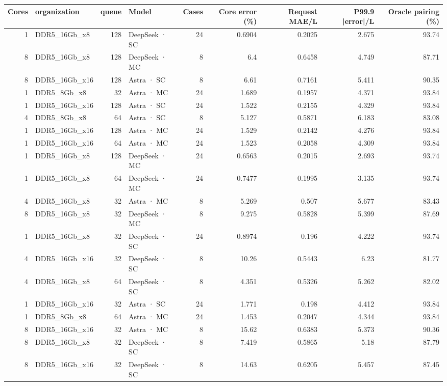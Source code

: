 \begin{tabular}{rlrlrrrrr}
\toprule
Cores & organization & queue & Model & Cases & Core error (\%) & Request MAE/L & P99.9 |error|/L & Oracle pairing (\%) \\
\midrule
1 & DDR5\_16Gb\_x8 & 128 & DeepSeek · SC & 24 & 0.6904 & 0.2025 & 2.675 & 93.74 \\
8 & DDR5\_16Gb\_x8 & 128 & DeepSeek · MC & 8 & 6.4 & 0.6458 & 4.749 & 87.71 \\
8 & DDR5\_16Gb\_x16 & 128 & Astra · SC & 8 & 6.61 & 0.7161 & 5.411 & 90.35 \\
1 & DDR5\_8Gb\_x8 & 32 & Astra · MC & 24 & 1.689 & 0.1957 & 4.371 & 93.84 \\
1 & DDR5\_16Gb\_x16 & 128 & Astra · SC & 24 & 1.522 & 0.2155 & 4.329 & 93.84 \\
4 & DDR5\_8Gb\_x8 & 64 & Astra · SC & 8 & 5.127 & 0.5871 & 6.183 & 83.08 \\
1 & DDR5\_16Gb\_x16 & 128 & Astra · MC & 24 & 1.529 & 0.2142 & 4.276 & 93.84 \\
1 & DDR5\_16Gb\_x16 & 64 & Astra · MC & 24 & 1.523 & 0.2058 & 4.309 & 93.84 \\
1 & DDR5\_16Gb\_x8 & 128 & DeepSeek · MC & 24 & 0.6563 & 0.2015 & 2.693 & 93.74 \\
1 & DDR5\_16Gb\_x8 & 64 & DeepSeek · MC & 24 & 0.7477 & 0.1995 & 3.135 & 93.74 \\
4 & DDR5\_16Gb\_x8 & 32 & Astra · MC & 8 & 5.269 & 0.507 & 5.677 & 83.43 \\
8 & DDR5\_16Gb\_x8 & 32 & DeepSeek · MC & 8 & 9.275 & 0.5828 & 5.399 & 87.69 \\
1 & DDR5\_16Gb\_x8 & 32 & DeepSeek · SC & 24 & 0.8974 & 0.196 & 4.222 & 93.74 \\
4 & DDR5\_16Gb\_x16 & 32 & DeepSeek · SC & 8 & 10.26 & 0.5443 & 6.23 & 81.77 \\
4 & DDR5\_16Gb\_x8 & 64 & DeepSeek · SC & 8 & 4.351 & 0.5326 & 5.262 & 82.02 \\
1 & DDR5\_16Gb\_x16 & 32 & Astra · SC & 24 & 1.771 & 0.198 & 4.412 & 93.84 \\
1 & DDR5\_8Gb\_x8 & 64 & Astra · MC & 24 & 1.453 & 0.2047 & 4.344 & 93.84 \\
8 & DDR5\_16Gb\_x16 & 32 & Astra · MC & 8 & 15.62 & 0.6383 & 5.373 & 90.36 \\
8 & DDR5\_16Gb\_x8 & 32 & DeepSeek · SC & 8 & 7.419 & 0.5865 & 5.18 & 87.79 \\
8 & DDR5\_16Gb\_x16 & 32 & DeepSeek · SC & 8 & 14.63 & 0.6205 & 5.457 & 87.45 \\

\end{tabular}
